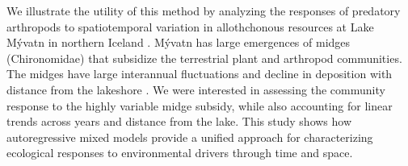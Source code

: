 We illustrate the utility of this method by analyzing the responses of predatory
arthropods to spatiotemporal variation in allothchonous resources \citep{Polis1997}
at Lake M\'{y}vatn in northern Iceland \citep{Einarsson2004}.
M\'{y}vatn has large emergences of midges
(Chironomidae) that subsidize the terrestrial plant \citep{Gratton2008}
and arthropod \citep{Dreyer2012} communities.
The midges have large interannual fluctuations \citep{Gardarsson2004}
and decline in deposition with distance from the lakeshore \citep{Dreyer2015}.
We were interested in assessing the community response to
the highly variable midge subsidy, while also accounting for linear trends across years
and distance from the lake.
This study shows how autoregressive mixed models provide a unified approach
for characterizing ecological responses to environmental drivers through time and space.
